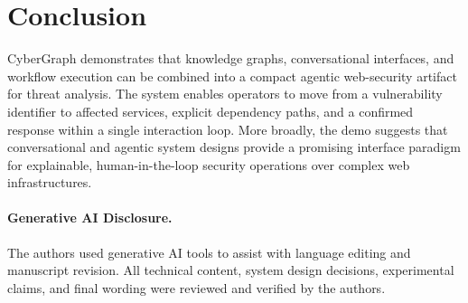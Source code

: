 \documentclass[runningheads]{llncs}
\newcommand{\sysname}{CyberGraph\xspace}
\begin{document}
\section{Conclusion}
\sysname demonstrates that knowledge graphs, conversational interfaces, and workflow execution can be combined into a compact agentic web-security artifact for threat analysis. The system enables operators to move from a vulnerability identifier to affected services, explicit dependency paths, and a confirmed response within a single interaction loop. More broadly, the demo suggests that conversational and agentic system designs provide a promising interface paradigm for explainable, human-in-the-loop security operations over complex web infrastructures.

\paragraph{Generative AI Disclosure.}
The authors used generative AI tools to assist with language editing and manuscript revision. All technical content, system design decisions, experimental claims, and final wording were reviewed and verified by the authors.



\end{document}
